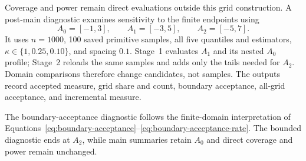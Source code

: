 Coverage and power remain direct evaluations outside this grid construction. A post-main diagnostic examines sensitivity to the finite endpoints using
\begin{equation}
  A_0=[-1,3],\qquad A_1=[-3,5],\qquad A_2=[-5,7].
  \label{eq:grid-diagnostic-domains}
\end{equation}
It uses $n=1000$, 100 saved primitive samples, all five quantiles and estimators, $\kappa\in\{1,0.25,0.10\}$, and spacing $0.1$. Stage~1 evaluates $A_1$ and its nested $A_0$ profile; Stage~2 reloads the same samples and adds only the tails needed for $A_2$. Domain comparisons therefore change candidates, not samples. The outputs record accepted measure, grid share and count, boundary acceptance, all-grid acceptance, and incremental measure.

The boundary-acceptance diagnostic follows the finite-domain interpretation of Equations~\eqref{eq:boundary-acceptance}--\eqref{eq:boundary-acceptance-rate}. The bounded diagnostic ends at $A_2$, while main summaries retain $A_0$ and direct coverage and power remain unchanged.
